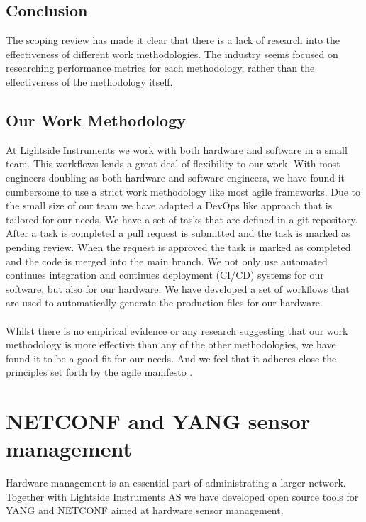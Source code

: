 \documentclass[12pt]{article}
\begin{document}
\subsection{Conclusion}
The scoping review has made it clear that there is a lack of research into the effectiveness of different work methodologies.
The industry seems focused on researching performance metrics for each methodology, rather than the 
effectiveness of the methodology itself.

\subsection{Our Work Methodology}
At Lightside Instruments we work with both hardware and software in a small team. 
This workflows lends a great deal of flexibility to our work.
With most engineers doubling as both hardware and software engineers, we have found it cumbersome to use a strict work methodology like most agile frameworks.
Due to the small size of our team we have adapted a DevOps like approach that is tailored for our needs. 
We have a set of tasks that are defined in a git repository. After a task is completed a pull request is submitted and the task
is marked as pending review. When the request is approved the task is marked as completed and the code is merged into the main branch.
We not only use automated continues integration and continues deployment (CI/CD) systems for our software, but also for our hardware.
We have developed a set of workflows that are used to automatically generate the production files for our hardware. 
\\
\\
Whilst there is no empirical evidence or any research suggesting that our work methodology is more effective than any of the other methodologies, 
we have found it to be a good fit for our needs. And we feel that it adheres close the principles set forth by the agile manifesto 
\cite{ManifestoAgileSoftware}.

\section{NETCONF and YANG sensor management}

Hardware management is an essential part of administrating a larger network. Together with Lightside Instruments AS we have 
developed open source tools for YANG and NETCONF aimed at hardware sensor management.
\end{document}
